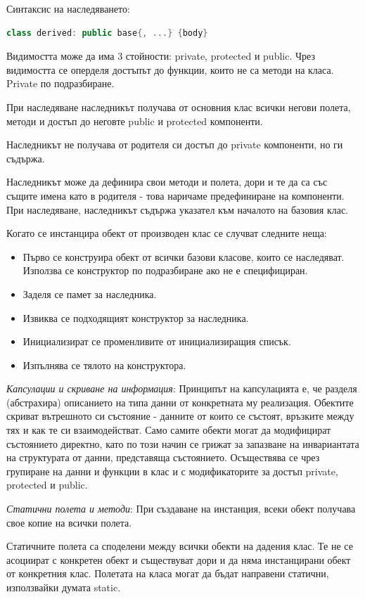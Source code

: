 \documentclass{article}
\renewcommand{\\}{\newline}
\begin{document}
Синтаксис на наследяването:
\begin{lstlisting}[language=C++]
class derived: public base{, ...} {body}
\end{lstlisting}

Видимостта може да има 3 стойности: private, protected и public. Чрез видимостта се оперделя достъпът до функции, които не са методи на класа. Private по подразбиране. 

При наследяване наследникът получава от основния клас всички негови полета, методи и достъп до неговте public и protected компоненти. 

Наследникът не получава от родителя си достъп до private компоненти, но ги съдържа. 

Наследникът може да дефинира свои методи и полета, дори и те да са със същите имена като в родителя - това наричаме предефиниране на компоненти. При наследяване, наследникът съдържа указател към началото на базовия клас.

Когато се инстанцира обект от производен клас се случват следните неща:
\begin{itemize}
    \item Първо се конструира обект от всички базови класове, които се наследяват. Използва се конструктор по подразбиране ако не е специфициран.
    \item Заделя се памет за наследника.
    \item Извиква се подходящият конструктор за наследника.
    \item Инициализират се променливите от инициализиращия списък.
    \item Изпълнява се тялото на конструктора.
\end{itemize}

\textit{Капсулации и скриване на информация}: Принципът на капсулацията е, че разделя (абстрахира) описанието на типа данни от конкретната му реализация. Обектите скриват вътрешното си състояние - данните от които се състоят, връзките между тях и как те си взаимодействат. Само самите обекти могат да модифицират състоянието директно, като по този начин се грижат за запазване на инвариантата на структурата от данни, представяща състоянието. Осъществява се чрез групиране на данни и функции в клас и с модификаторите за достъп private, protected и public.

\textit{Статични полета и методи}: При създаване на инстанция, всеки обект получава свое копие на всички полета. 

Статичните полета са споделени между всички обекти на дадения клас. Те не се асоциират с конкретен обект и съществуват дори и да няма инстанцирани обект от конкретния клас. Полетата на класа могат да бъдат направени статични, използвайки думата static. 
\end{document}
